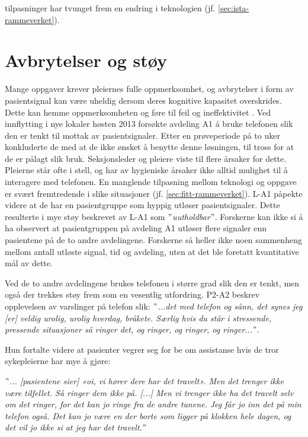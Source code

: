 tilpasninger har tvunget frem en endring i teknologien (jf. \ref{sec:ista-rammeverket}).

\section{Avbrytelser og støy}
Mange oppgaver krever pleiernes fulle oppmerksomhet, og avbrytelser i form av pasientsignal kan være uheldig dersom deres kognitive kapasitet overskrides. Dette kan hemme oppmerksomheten og føre til feil og ineffektivitet \citep{Ebright10, Parker00}.
Ved innflytting i nye lokaler høsten 2013 forsøkte avdeling A1 å bruke telefonen slik den er tenkt til mottak av pasientsignaler. Etter en prøveperiode på to uker konkluderte de med at de ikke ønsket å benytte denne løsningen, til tross for at de er pålagt slik bruk. Seksjonsleder og pleiere viste til flere årsaker for dette. Pleierne står ofte i stell, og har av hygieniske årsaker ikke alltid mulighet til å interagere med telefonen. En manglende tilpasning mellom teknologi og oppgave er svært fremtredende i slike situasjoner (jf. \ref{sec:fitt-rammeverket}). L-A1 påpekte videre at de har en pasientgruppe som hyppig utløser pasientsignaler. Dette resulterte i mye støy beskrevet av L-A1 som \textit{$"$uutholdbar$"$}. Forskerne kan ikke si å ha observert at pasientgruppen på avdeling A1 utløser flere signaler enn pasientene på de to andre avdelingene. Forskerne så heller ikke noen sammenheng mellom antall utløste signal, tid og avdeling, uten at det ble foretatt kvantitative mål av dette.

\noindent
Ved de to andre avdelingene brukes telefonen i større grad slik den er tenkt, men også der trekkes støy frem som en vesentlig utfordring. P2-A2 beskrev opplevelsen av varslinger på telefon slik: \textit{ $"$...det med telefon og sånn, det synes jeg [er] veldig urolig, urolig hverdag, bråkete. Særlig hvis du står i stressende, pressende situasjoner så ringer det, og ringer, og ringer, og ringer...$"$}. 

\noindent
Hun fortalte videre at pasienter vegrer seg for be om assistanse hvis de tror sykepleierne har mye å gjøre:

\noindent
\textit{$"$... [pasientene sier] «oi, vi hører dere har det travelt». Men det trenger ikke være tilfellet. Så ringer dem ikke på. [...] Men vi trenger ikke ha det travelt selv om det ringer, for det kan jo ringe fra de andre tunene. Jeg får jo inn det på min telefon også. Det kan jo være en der borte som ligger på klokken hele dagen, og det vil jo ikke si at jeg har det travelt.$"$}

